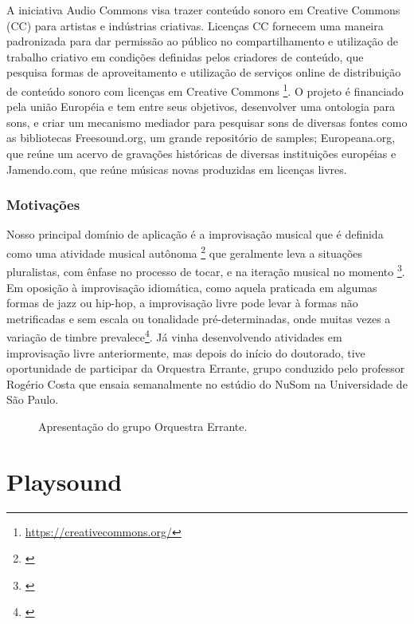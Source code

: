 

A iniciativa Audio Commons visa trazer conteúdo sonoro em Creative Commons (CC) para artistas e indústrias criativas. Licenças CC fornecem uma maneira padronizada para dar permissão ao público no compartilhamento e utilização de trabalho criativo em condições definidas pelos criadores de conteúdo, que pesquisa formas de aproveitamento e utilização de serviços online de distribuição de conteúdo sonoro com licenças em Creative Commons \footnote{\url{https://creativecommons.org/}}. O projeto é financiado pela união Européia e tem entre seus objetivos, desenvolver uma ontologia para sons, e criar um mecanismo mediador para pesquisar sons de diversas fontes como as bibliotecas Freesound.org, um grande repositório de samples; Europeana.org, que reúne um acervo de gravações históricas de diversas instituições européias e Jamendo.com, que reúne músicas novas produzidas em licenças livres.

\subsection{Motivações}
Nosso principal domínio de aplicação é a improvisação musical que é definida como uma atividade musical autônoma \footnote{\cite{Canonne2016}} que geralmente leva a situações pluralistas, com ênfase no processo de tocar, e na iteração musical no momento \footnote{\cite{BERGSTROEM-NIELSEN2016}}. Em oposição à improvisação idiomática, como aquela praticada em algumas formas de jazz ou hip-hop, a improvisação livre pode levar à formas não metrificadas e sem escala ou tonalidade pré-determinadas, onde muitas vezes a variação de timbre prevalece\footnote{\cite{Barthet:11a}}. Já vinha desenvolvendo atividades em improvisação livre anteriormente, mas depois do início do doutorado, tive oportunidade de participar da Orquestra Errante, grupo conduzido pelo professor Rogério Costa que ensaia semanalmente no estúdio do NuSom na Universidade de São Paulo. 

\begin{figure}
   
   \caption{Apresentação do grupo Orquestra Errante.}
    \label{fig:oe}
 \end{figure}

 \chapter{Playsound}
\label{ch:playsound}


